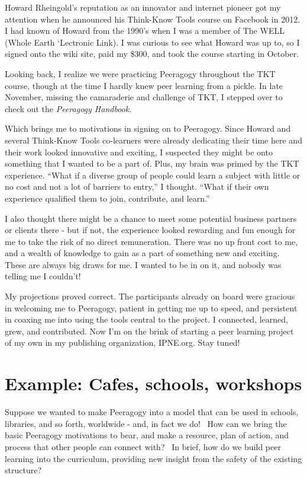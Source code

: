 Howard Rheingold's reputation as an innovator and internet pioneer got
my attention when he announced his Think-Know Tools course on Facebook
in 2012. I had known of Howard from the 1990's when I was a member of
The WELL (Whole Earth `Lectronic Link). I was curious to see what Howard
was up to, so I signed onto the wiki site, paid my \$300, and took the
course starting in October.

Looking back, I realize we were practicing Peeragogy throughout the TKT
course, though at the time I hardly knew peer learning from a pickle. In
late November, missing the camaraderie and challenge of TKT, I stepped
over to check out the \emph{Peeragogy Handbook}.

Which brings me to motivations in signing on to Peeragogy. Since Howard
and several Think-Know Tools co-learners were already dedicating their
time here and their work looked innovative and exciting, I suspected
they might be onto something that I wanted to be a part of. Plus, my
brain was primed by the TKT experience. ``What if a diverse group of
people could learn a subject with little or no cost and not a lot of
barriers to entry,'' I thought. ``What if their own experience qualified
them to join, contribute, and learn.''

I also thought there might be a chance to meet some potential business
partners or clients there - but if not, the experience looked rewarding
and fun enough for me to take the risk of no direct remuneration. There
was no up front cost to me, and a wealth of knowledge to gain as a part
of something new and exciting. These are always big draws for me. I
wanted to be in on it, and nobody was telling me I couldn't!

My projections proved correct. The participants already on board were
gracious in welcoming me to Peeragogy, patient in getting me up to
speed, and persistent in coaxing me into using the tools central to the
project. I connected, learned, grew, and contributed. Now I'm on the
brink of starting a peer learning project of my own in my publishing
organization, IPNE.org. Stay tuned!

\section*{Example: Cafes, schools, workshops}

Suppose we wanted to make Peeragogy into a model that can be used in
schools, libraries, and so forth, worldwide - and, in fact we do! ~How
can we bring the basic Peeragogy motivations to bear, and make a
resource, plan of action, and process that other people can connect
with? ~In brief, how do we build peer learning into the
curriculum, providing new insight from the safety of the existing
structure?

